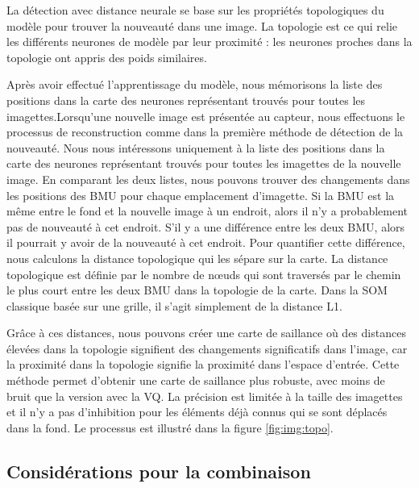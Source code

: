 	La détection avec distance neurale se base sur les propriétés topologiques du modèle pour trouver la nouveauté dans une image. La topologie est ce qui relie les différents neurones de modèle par leur proximité : les neurones proches dans la topologie ont appris des poids similaires.

	Après avoir effectué l'apprentissage du modèle, nous mémorisons la liste des positions dans la carte des neurones représentant trouvés pour toutes les imagettes.Lorsqu'une nouvelle image est présentée au capteur, nous effectuons le processus de reconstruction comme dans la première méthode de détection de la nouveauté. Nous nous intéressons uniquement à la liste des positions dans la carte des neurones représentant trouvés pour toutes les imagettes de la nouvelle image. En comparant les deux listes, nous pouvons trouver des changements dans les positions des BMU pour chaque emplacement d'imagette. Si la BMU est la même entre le fond et la nouvelle image à un endroit, alors il n'y a probablement pas de nouveauté à cet endroit. S'il y a une différence entre les deux BMU, alors il pourrait y avoir de la nouveauté à cet endroit. Pour quantifier cette différence, nous calculons la distance topologique qui les sépare sur la carte. La distance topologique est définie par le nombre de nœuds qui sont traversés par le chemin le plus court entre les deux BMU dans la topologie de la carte. Dans la SOM classique basée sur une grille, il s'agit simplement de la distance L1.

	Grâce à ces distances, nous pouvons créer une carte de saillance où des distances élevées dans la topologie signifient des changements significatifs dans l'image, car la proximité dans la topologie signifie la proximité dans l'espace d'entrée. Cette méthode permet d'obtenir une carte de saillance plus robuste, avec moins de bruit que la version avec la VQ. La précision est limitée à la taille des imagettes et il n'y a pas d'inhibition pour les éléments déjà connus qui se sont déplacés dans la fond. Le processus est illustré dans la figure \ref{fig:img:topo}.

	\subsection{Considérations pour la combinaison}
	
